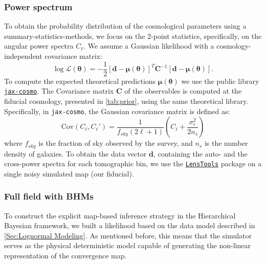 \documentclass{aa}
\begin{document}
\subsubsection{Power spectrum}
To obtain the probability distribution of the cosmological parameters using a summary-statistics-methods, we focus on the 2-point statistics, specifically, on the angular power spectra $C_{\ell}$.
We assume a Gaussian likelihood with a cosmology-independent covariance matrix:
\begin{equation}
    \log{\mathcal{L}}(\bm{\theta})=-\frac{1}{2}[\bm{d}-\bm{\mu}(\bm{\theta})]^{T}\bm{C}^{-1}[\bm{d}-\bm{\mu}(\bm{\theta})].
\end{equation}
To compute the expected theoretical predictions $\bm{\mu}(\bm{\theta})$ we use the public library \href{https://github.com/DifferentiableUniverseInitiative/jax_cosmo}{\texttt{jax-cosmo}}. 
 The Covariance matrix $\bm{C}$ of the observables is computed at the fiducial cosmology, presented in \autoref{tab:prior}, using the same theoretical library. Specifically, in {\texttt{jax-cosmo}}, the Gaussian covariance matrix is defined as:
\begin{equation}
    \text{Cov}(C_{\ell},C_{\ell}')=\frac{1}{f_{sky}(2 \ell+1)}\left(C_{\ell}+\frac{\sigma_{\epsilon}^2}{2n_s}\right)
\end{equation}
where $f_{sky}$ is the fraction of sky observed by the survey, and $n_s$ is the number density of galaxies. 
To obtain the data vector $\bm{d}$, containing the auto- and the cross-power spectra for each tomographic bin, we use the \href{https://lenstools.readthedocs.io/en/latest/lenstool} {\texttt{LensTools}} package \citep{2016A&C....17...73P} on a single noisy simulated map (our fiducial).
\subsubsection{Full field with BHMs}
To construct the explicit map-based inference strategy in the Hierarchical Bayesian framework, we built a likelihood based on the data model described in \autoref{Sec:Lognormal Modeling}. 
As mentioned before, this means that the simulator serves as the physical deterministic model capable of generating the non-linear representation of the convergence map.
\end{document}
